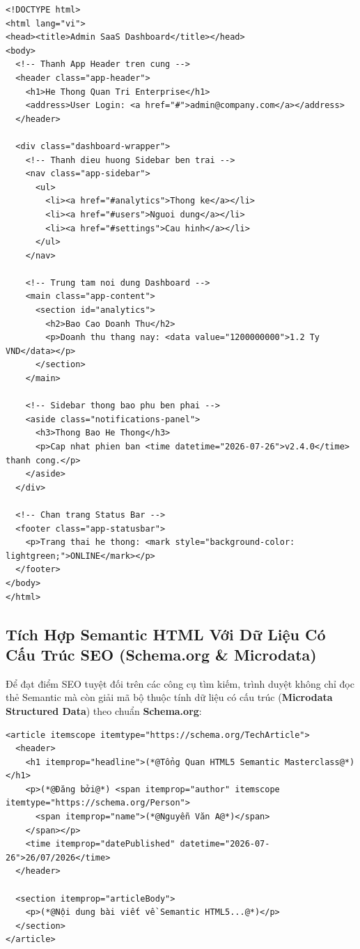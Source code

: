 \documentclass[11pt,oneside]{book}
\newcommand{\term}[1]{\textbf{\textcolor{primaryBlue}{#1}}}
\begin{document}
\begin{codeWindowBreakable}
\begin{lstlisting}[language=HTML5]
<!DOCTYPE html>
<html lang="vi">
<head><title>Admin SaaS Dashboard</title></head>
<body>
  <!-- Thanh App Header tren cung -->
  <header class="app-header">
    <h1>He Thong Quan Tri Enterprise</h1>
    <address>User Login: <a href="#">admin@company.com</a></address>
  </header>

  <div class="dashboard-wrapper">
    <!-- Thanh dieu huong Sidebar ben trai -->
    <nav class="app-sidebar">
      <ul>
        <li><a href="#analytics">Thong ke</a></li>
        <li><a href="#users">Nguoi dung</a></li>
        <li><a href="#settings">Cau hinh</a></li>
      </ul>
    </nav>

    <!-- Trung tam noi dung Dashboard -->
    <main class="app-content">
      <section id="analytics">
        <h2>Bao Cao Doanh Thu</h2>
        <p>Doanh thu thang nay: <data value="1200000000">1.2 Ty VND</data></p>
      </section>
    </main>

    <!-- Sidebar thong bao phu ben phai -->
    <aside class="notifications-panel">
      <h3>Thong Bao He Thong</h3>
      <p>Cap nhat phien ban <time datetime="2026-07-26">v2.4.0</time> thanh cong.</p>
    </aside>
  </div>

  <!-- Chan trang Status Bar -->
  <footer class="app-statusbar">
    <p>Trang thai he thong: <mark style="background-color: lightgreen;">ONLINE</mark></p>
  </footer>
</body>
</html>
\end{lstlisting}
\end{codeWindowBreakable}

\clearpage
\subsection{Tích Hợp Semantic HTML Với Dữ Liệu Có Cấu Trúc SEO (Schema.org \& Microdata)}

Để đạt điểm SEO tuyệt đối trên các công cụ tìm kiếm, trình duyệt không chỉ đọc thẻ Semantic mà còn giải mã bộ thuộc tính dữ liệu có cấu trúc (\term{Microdata Structured Data}) theo chuẩn \textbf{Schema.org}:

\begin{codeWindow}
\begin{lstlisting}[language=HTML5]
<article itemscope itemtype="https://schema.org/TechArticle">
  <header>
    <h1 itemprop="headline">(*@Tổng Quan HTML5 Semantic Masterclass@*)</h1>
    <p>(*@Đăng bởi@*) <span itemprop="author" itemscope itemtype="https://schema.org/Person">
      <span itemprop="name">(*@Nguyễn Văn A@*)</span>
    </span></p>
    <time itemprop="datePublished" datetime="2026-07-26">26/07/2026</time>
  </header>

  <section itemprop="articleBody">
    <p>(*@Nội dung bài viết về Semantic HTML5...@*)</p>
  </section>
</article>
\end{lstlisting}
\end{codeWindow}
\end{document}
